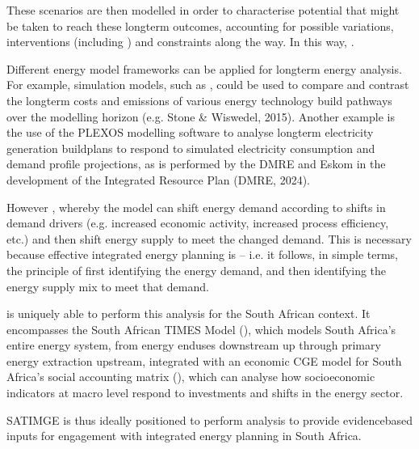 \documentclass[letterpaper,10pt,english]{jupyterBook}
\begin{document}
\sphinxAtStartPar
These scenarios are then modelled in order to characterise potential  that might be taken to reach these long\sphinxhyphen{}term outcomes, accounting for possible variations, interventions (including ) and constraints along the way. In this way, .

\sphinxAtStartPar
Different energy model frameworks can be applied for long\sphinxhyphen{}term energy analysis. For example, simulation models, such as , could be used to compare and contrast the long\sphinxhyphen{}term costs and emissions of various energy technology build pathways over the modelling horizon (e.g. Stone \& Wiswedel, 2015). Another example is the use of the PLEXOS modelling software to analyse long\sphinxhyphen{}term electricity generation build\sphinxhyphen{}plans to respond to simulated electricity consumption and demand profile projections, as is performed by the DMRE and Eskom in the development of the Integrated Resource Plan (DMRE, 2024).

\sphinxAtStartPar
However , whereby the model can shift energy demand according to shifts in demand drivers (e.g. increased economic activity, increased process efficiency, etc.) and then shift energy supply to meet the changed demand. This is necessary because effective integrated energy planning is  – i.e. it follows, in simple terms, the principle of first identifying the energy demand, and then identifying the energy supply mix to meet that demand.

\sphinxAtStartPar
{} is uniquely able to perform this analysis for the South African context. It encompasses the South African TIMES Model (), which models South Africa’s entire energy system, from energy end\sphinxhyphen{}uses downstream up through primary energy extraction upstream, integrated with an economic CGE model for South Africa’s social accounting matrix (), which can analyse how socio\sphinxhyphen{}economic indicators at macro level respond to investments and shifts in the energy sector.

\sphinxAtStartPar
SATIMGE is thus ideally positioned to perform analysis to provide evidence\sphinxhyphen{}based inputs for engagement with integrated energy planning in South Africa.
\end{document}
